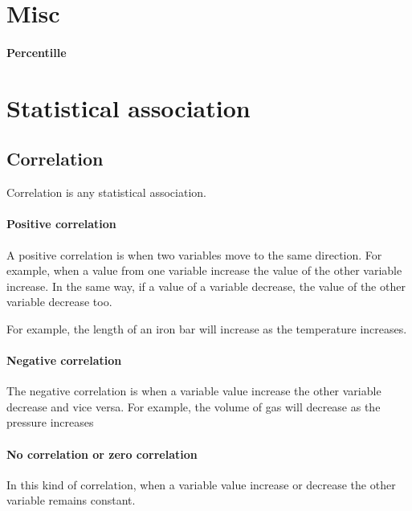 \documentclass[]{article}
\begin{document}
\section{Misc}

\paragraph{Percentille}

\section{Statistical association}

\subsection{Correlation}

Correlation is any statistical association.

\paragraph{Positive correlation}
A positive correlation is when two variables move to the same direction. For example, when a value from 
one variable increase the value of the other variable increase. In the same way, if a value of a variable
decrease, the value of the other variable decrease too.

For example, the length of an iron bar will increase as the temperature increases.

\paragraph{Negative correlation}
The negative correlation is when a variable value increase the other variable decrease and vice versa. 
For example, the volume of gas will decrease as the pressure increases

\paragraph{No correlation or zero correlation}
In this kind of correlation, when a variable value increase or decrease the other variable remains constant.


\end{document}
